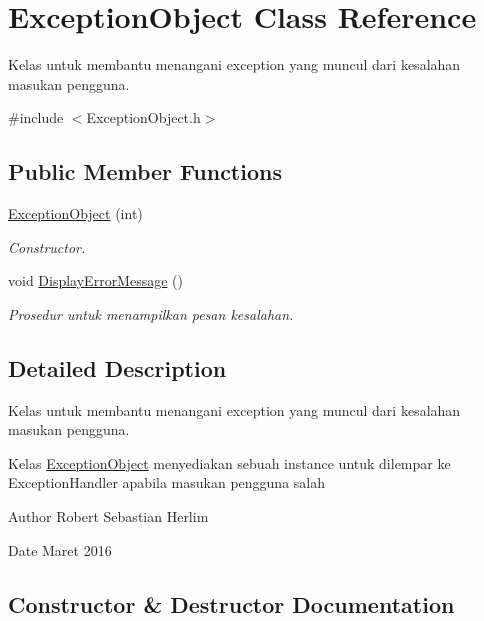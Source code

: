 \hypertarget{class_exception_object}{}\section{Exception\+Object Class Reference}
\label{class_exception_object}


Kelas untuk membantu menangani exception yang muncul dari kesalahan masukan pengguna.  




{\ttfamily \#include $<$Exception\+Object.\+h$>$}

\subsection*{Public Member Functions}
\begin{DoxyCompactItemize}
\item 
\hyperlink{class_exception_object_a25372a2efb503791bd5be72d320b6025}{Exception\+Object} (int)
\begin{DoxyCompactList}\small\item\em Constructor. \end{DoxyCompactList}\item 
void \hyperlink{class_exception_object_a79bec5cf1474c4fab59b09e2829bf4f2}{Display\+Error\+Message} ()
\begin{DoxyCompactList}\small\item\em Prosedur untuk menampilkan pesan kesalahan. \end{DoxyCompactList}\end{DoxyCompactItemize}


\subsection{Detailed Description}
Kelas untuk membantu menangani exception yang muncul dari kesalahan masukan pengguna. 

Kelas \hyperlink{class_exception_object}{Exception\+Object} menyediakan sebuah instance untuk dilempar ke Exception\+Handler apabila masukan pengguna salah \begin{DoxyAuthor}{Author}
Robert Sebastian Herlim 
\end{DoxyAuthor}
\begin{DoxyDate}{Date}
Maret 2016 
\end{DoxyDate}


\subsection{Constructor \& Destructor Documentation}
